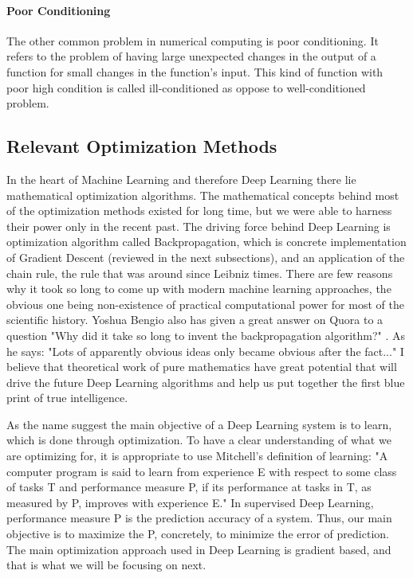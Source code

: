 \documentclass[paper=a4, fontsize=11pt]{scrartcl}
\numberwithin{equation}{section}		%
\numberwithin{figure}{section}			%
\numberwithin{table}{section}			%
\begin{document}
	\paragraph{Poor Conditioning}  
	The other common problem in numerical computing is poor conditioning. It refers to the problem of having large unexpected changes in the output of a function for small changes in the function's input. This kind of function with poor high condition is called ill-conditioned as oppose to well-conditioned problem.
	
	\subsection{Relevant Optimization Methods}
    In the heart of Machine Learning and therefore Deep Learning there lie mathematical optimization algorithms. The mathematical concepts behind most of the optimization methods existed for long time, but we were able to harness their power only in the recent past. The driving force behind Deep Learning is optimization algorithm called Backpropagation, which is concrete implementation of Gradient Descent (reviewed in the next subsections), and an application of the chain rule, the rule that was around since Leibniz times. There are few reasons why it took so long to come up with modern machine learning approaches, the obvious one being non-existence of practical computational power for most of the scientific history. Yoshua Bengio also has given a great answer on Quora to a question "Why did it take so long to invent the backpropagation algorithm?" \cite{YoshuaBengioQuoraWhy-did-it-take-so-long}. As he says: "Lots of apparently obvious ideas only became obvious after the fact..." I believe that theoretical work of pure mathematics have great potential that will drive the future Deep Learning algorithms and help us put together the first blue print of true intelligence.\par
    As the name suggest the main objective of a Deep Learning system is to learn, which is done through optimization. To have a clear understanding of what we are optimizing for, it is appropriate to use Mitchell's \cite{Machine-Learning-Tom-Mitchell-1997} definition of learning: "A computer program is said to learn from experience E with respect to some class of tasks T and performance measure P, if its performance at tasks in T, as measured by P, improves with experience E." In supervised Deep Learning, performance measure P is the prediction accuracy of a system. Thus, our main objective is to maximize the P, concretely, to minimize the error of prediction. The main optimization approach used in Deep Learning is gradient based, and that is what we will be focusing on next.  
\end{document}
